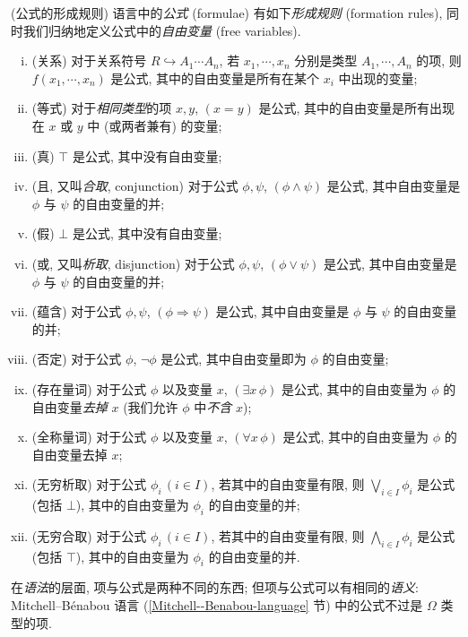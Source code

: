 \begin{definition}
	[label={formula}]
	{(公式的形成规则)}
	语言中的\emph{公式} (formulae) 有如下\emph{形成规则} (formation rules), 同时我们归纳地定义公式中的\emph{自由变量} (free variables).
	\begin{enumerate}[(i)]
		\item (关系) 对于关系符号 $R \hookrightarrow A_1\cdots A_n$, 若 $x_1,\cdots,x_n$ 分别是类型 $A_1,\cdots,A_n$ 的项, 则 $f(x_1,\cdots,x_n)$ 是公式, 其中的自由变量是所有在某个 $x_i$ 中出现的变量;
		\item (等式) 对于\emph{相同类型}的项 $x,y$, $(x=y)$ 是公式, 其中的自由变量是所有出现在 $x$ 或 $y$ 中 (或两者兼有) 的变量;
		\item (真) $\top$ 是公式, 其中没有自由变量;
		\item (且, 又叫\emph{合取}, conjunction) 对于公式 $\phi,\psi$, $(\phi\wedge\psi)$ 是公式, 其中自由变量是 $\phi$ 与 $\psi$ 的自由变量的并;
		\item (假) $\bot$ 是公式, 其中没有自由变量;
		\item (或, 又叫\emph{析取}, disjunction) 对于公式 $\phi,\psi$, $(\phi\vee\psi)$ 是公式, 其中自由变量是 $\phi$ 与 $\psi$ 的自由变量的并;
		\item (蕴含) 对于公式 $\phi,\psi$, $(\phi\Rightarrow \psi)$ 是公式, 其中自由变量是 $\phi$ 与 $\psi$ 的自由变量的并;
		\item (否定) 对于公式 $\phi$, $\neg\phi$ 是公式, 其中自由变量即为 $\phi$ 的自由变量;
		\item (存在量词) 对于公式 $\phi$ 以及变量 $x$, $(\exists x\,\phi)$ 是公式, 其中的自由变量为 $\phi$ 的自由变量\emph{去掉} $x$ (我们允许 $\phi$ 中\emph{不含} $x$);
		\item (全称量词) 对于公式 $\phi$ 以及变量 $x$, $(\forall x\,\phi)$ 是公式, 其中的自由变量为 $\phi$ 的自由变量去掉 $x$;
		\item (无穷析取) 对于公式 $\phi_i\, (i\in I)$, 若其中的自由变量有限, 则 $\bigvee_{i\in I}\phi_i$ 是公式 (包括 $\bot$), 其中的自由变量为 $\phi_i$ 的自由变量的并;
		\item (无穷合取) 对于公式 $\phi_i\, (i\in I)$, 若其中的自由变量有限, 则 $\bigwedge_{i\in I}\phi_i$ 是公式 (包括 $\top$), 其中的自由变量为 $\phi_i$ 的自由变量的并.
	\end{enumerate}
\end{definition}

\begin{remark}
	{}
	在\emph{语法}的层面, 项与公式是两种不同的东西; 但项与公式可以有相同的\emph{语义}: Mitchell--B\'enabou 语言 (\ref{Mitchell--Benabou-language} 节) 中的公式不过是 $\Omega$ 类型的项.
\end{remark}



